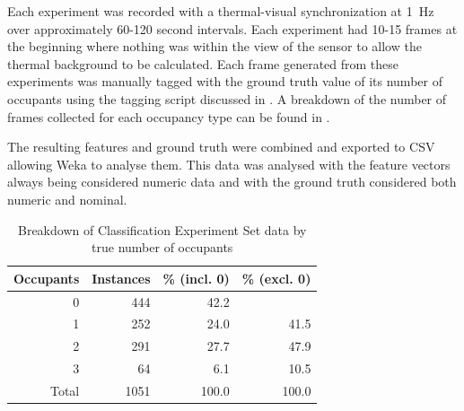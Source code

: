 \documentclass[../thesis/thesis.tex]{subfiles}
\begin{document}
Each experiment was recorded with a thermal-visual synchronization at 1~Hz over approximately 60-120 second intervals. Each experiment had 10-15 frames at the beginning where nothing was within the view of the sensor to allow the thermal background to be calculated. Each frame generated from these experiments was manually tagged with the ground truth value of its number of occupants using the tagging script discussed in . A breakdown of the number of frames collected for each occupancy type can be found in .

The resulting features and ground truth were combined and exported to CSV allowing Weka to analyse them. This data was analysed with the feature vectors always being considered numeric data and with the ground truth considered both numeric and nominal.

\begin{table}[b]
\centering
\begin{tabular}{|r|r|r|r|}
\hline
\textbf{Occupants} & \textbf{Instances} & \textbf{\% (incl. 0)} & \textbf{\% (excl. 0)} \\ \hline
0                  & 444                & 42.2                  &                       \\ \hline
1                  & 252                & 24.0                  & 41.5                  \\ \hline
2                  & 291                & 27.7                  & 47.9                  \\ \hline
3                  & 64                 & 6.1                   & 10.5                  \\ \hline
Total              & 1051               & 100.0                 & 100.0                 \\ \hline
\end{tabular}
\caption{Breakdown of Classification Experiment Set data by true number of occupants}
\label{tab:expbreak}
\end{table}
\end{document}

